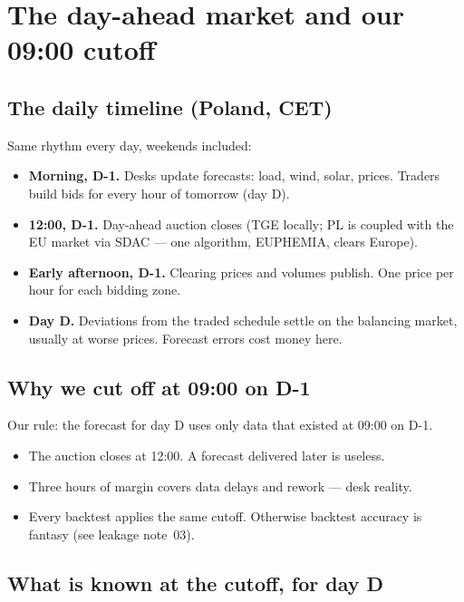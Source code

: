 \section{The day-ahead market and our 09:00 cutoff}

\subsection{The daily timeline (Poland, CET)}

Same rhythm every day, weekends included:

\begin{itemize}
  \item \textbf{Morning, D-1.} Desks update forecasts: load, wind, solar, prices.
        Traders build bids for every hour of tomorrow (day D).
  \item \textbf{12:00, D-1.} Day-ahead auction closes (TGE locally; PL is coupled
        with the EU market via SDAC --- one algorithm, EUPHEMIA, clears Europe).
  \item \textbf{Early afternoon, D-1.} Clearing prices and volumes publish.
        One price per hour for each bidding zone.
  \item \textbf{Day D.} Deviations from the traded schedule settle on the
        balancing market, usually at worse prices. Forecast errors cost money here.
\end{itemize}

\subsection{Why we cut off at 09:00 on D-1}

Our rule: the forecast for day D uses only data that existed at 09:00 on D-1.

\begin{itemize}
  \item The auction closes at 12:00. A forecast delivered later is useless.
  \item Three hours of margin covers data delays and rework --- desk reality.
  \item Every backtest applies the same cutoff. Otherwise backtest accuracy
        is fantasy (see leakage note~03).
\end{itemize}

\subsection{What is known at the cutoff, for day D}

